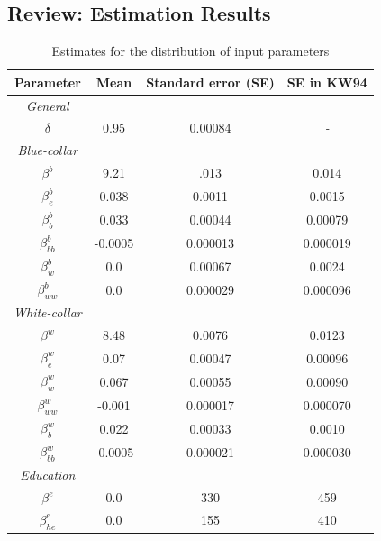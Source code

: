 \documentclass[a4paper,12pt]{article}
\begin{document}
\subsection{Review: Estimation Results}
\setlength{\tabcolsep}{18pt} %
\begin{table}[H] 
	\centering
	\begin{threeparttable}
		\caption[Model Parametrization]{Estimates for the distribution of input parameters}
		\label{tab:params}
		\renewcommand{\arraystretch}{1.2}%
		\begin{tabular}{cS[table-format=3.2]S[table-format=3.2]S[table-format=3.2]}
			\toprule
			{Parameter}     & {Mean}   & {Standard error (SE)} & {SE in KW94} \\ \midrule
			\textit{General} \\
			$\delta$ & 0.95   & 0.00084 & \textit{-}    \\    \midrule
			\textit{Blue-collar}\\    
			$\beta^b$ & 9.21   & .013            & 0.014      \\
			$\beta_e^b$ & 0.038  &    0.0011        & 0.0015       \\
			$\beta^b_b$ & 0.033  & 0.00044            & 0.00079       \\
			$\beta^b_{bb}$ & -0.0005 & 0.000013           & 0.000019       \\
			$\beta^b_w$ & 0.0    & 0.00067             & 0.0024      \\
			$\beta^b_{ww}$ & 0.0    & 0.000029           & 0.000096       \\ \midrule
			\textit{White-collar}\\
			$\beta^w$ & 8.48   & 0.0076             & 0.0123      \\
			$\beta^w_e$ & 0.07   & 0.00047          & 0.00096       \\
			$\beta^w_w$ & 0.067  & 0.00055            & 0.00090      \\
			$\beta^w_{ww}$ & -0.001  & 0.000017           & 0.000070     \\
			$\beta^w_b$ & 0.022  & 0.00033           & 0.0010      \\
			$\beta^w_{bb}$ & -0.0005 & 0.000021         & 0.000030      \\ \midrule
			\textit{Education} \\
			$\beta^e$     & 0.0    & 330                & 459       \\
			$\beta_{he}^e$     & 0.0    & 155               & 410       \\

\end{tabular}
\end{threeparttable}
\end{table}
\end{document}
